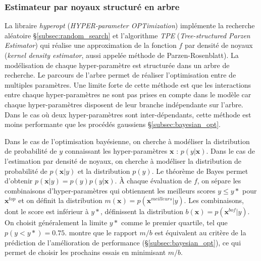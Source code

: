 \subsubsection{Estimateur par noyaux structuré en arbre} \label{subsubsec:tpe_opt}
La libraire \textit{hyperopt} \cite{bergstra_making_2013} (\textit{HYPER-parameter OPTimization}) implémente la recherche aléatoire §\ref{subsec:random_search} et l'algorithme \textit{TPE} (\textit{Tree-structured Parzen Estimator}) \cite{bergstra_algorithms_2011} qui réalise une approximation de la fonction $f$ par densité de noyaux (\textit{kernel density estimator}, aussi appelée méthode de Parzen-Rosenblatt).
La modélisation de chaque hyper-paramètre est structurée dans un arbre de recherche.
Le parcours de l'arbre permet de réaliser l'optimisation entre de multiples paramètres.
Une limite forte de cette méthode est que les interactions entre chaque hyper-paramètres ne sont pas prises en compte dans le modèle car chaque hyper-paramètres disposent de leur branche indépendante sur l'arbre.
Dans le cas où deux hyper-paramètres sont inter-dépendants, cette méthode est moins performante que les procédés gaussiens §\ref{subsec:bayesian_opt}.

Dans le cas de l'optimisation bayésienne, on cherche à modéliser la distribution de probabilité de $y$ connaissant les hyper-paramètres $\boldsymbol{x}$ : $p(y | \boldsymbol{x})$.
Dans le cas de l'estimation par densité de noyaux, on cherche à modéliser la distribution de probabilité de $p(\boldsymbol{x} | y)$ et la distribution $p(y)$.
Le théorème de Bayes permet d'obtenir $p(\boldsymbol{x} | y) = p(y) p(y | \boldsymbol{x})$.
À chaque évaluation de $f$, on sépare les combinaisons d'hyper-paramètres qui obtiennent les meilleurs scores $y \le y*$ pour $\boldsymbol{x}^{top}$ et on définit la distribution $m(\boldsymbol{x})=p(\boldsymbol{x}^{meilleurs} | y)$.
Les combinaisons, dont le score est inférieur à $y*$, définissent la distribution $b(\boldsymbol{x})=p(\boldsymbol{x}^{bof} | y)$.
On choisit généralement la limite $y*$ comme le premier quartile, tel que $p(y < y*) = 0.75$.
\cite{bergstra_algorithms_2011} montre que le rapport $m/b$ est équivalent au critère de la prédiction de l'amélioration de performance (§\ref{subsec:bayesian_opt}), ce qui permet de choisir les prochains essais en minimisant $m/b$.


